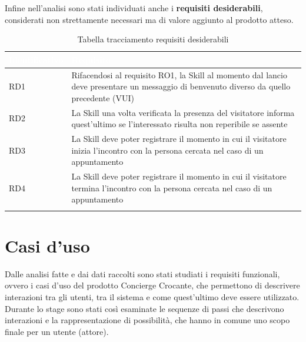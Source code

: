 \noindent Infine nell'analisi sono stati individuati anche i \textbf{requisiti desiderabili}, considerati non strettamente necessari ma di valore aggiunto al prodotto atteso.
\begin{center}
	\centering
	\renewcommand{\arraystretch}{1.5}
	\begin{longtable}{  p{2.5cm} p{9.8cm} }
		\rowcolor{tableHead}
		\textbf{\textcolor{white}{Identificativo}} & \textbf{\textcolor{white}{Requisito}} \\
		\endhead
		RD1 & Rifacendosi al requisito RO1, la Skill al momento dal lancio deve presentare un messaggio di benvenuto diverso da quello precedente (VUI) \\
		RD2 & La Skill una volta verificata la presenza del visitatore informa quest'ultimo se l'interessato risulta non reperibile se assente \\
		RD3 & La Skill deve poter registrare il momento in cui il visitatore inizia l'incontro con la persona cercata nel caso di un appuntamento \\
		RD4 & La Skill deve poter registrare il momento in cui il visitatore termina l'incontro con la persona cercata nel caso di un appuntamento \\
		\rowcolor{white}
		\caption{Tabella tracciamento requisiti desiderabili}
	\end{longtable}
\end{center}

\newpage
\section{Casi d'uso}
Dalle analisi fatte e dai dati raccolti sono stati studiati i requisiti funzionali, ovvero i casi d'uso del prodotto Concierge Crocante, che permettono di descrivere interazioni tra gli utenti, tra il sistema e come quest'ultimo deve essere utilizzato. Durante lo stage sono stati così esaminate le sequenze di passi che descrivono interazioni e la rappresentazione di possibilità, che hanno in comune uno scopo finale per un utente (attore).
